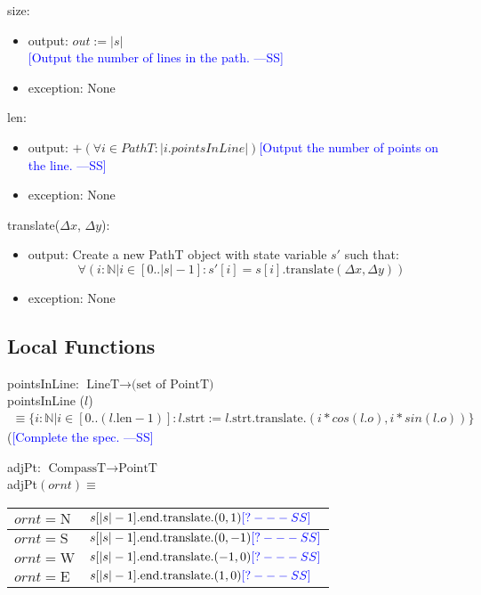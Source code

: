 \documentclass[12pt]{article}
\newcommand{\authornote}[3]{\textcolor{#1}{[#3 ---#2]}}
\newcommand{\authornote}[3]{}
\newcommand{\wss}[1]{\authornote{blue}{SS}{#1}}
\begin{document}
\noindent size:
\begin{itemize}
\item output: $out:=|s|$\\ \wss{Output the number of lines in the path.}
\item exception: None
\end{itemize}

\noindent len:
\begin{itemize}
\item output: $+(\forall i \in PathT: |i.pointsInLine|)$\wss{Output the number of points on the line.}
\item exception: None
\end{itemize}

\noindent translate($\Delta x$, $\Delta y$):
\begin{itemize}
\item output: Create a new PathT object with state variable $s'$ such that:
$$\forall(i: \mathbb{N} | i \in [0..|s|-1] : s'[i] = s[i].\mbox{translate}(\Delta x, \Delta y))$$
\item exception: None
\end{itemize}

\subsection*{Local Functions}

pointsInLine: $\mbox{LineT} \rightarrow \mbox{(set of PointT)}$\\

\noindent pointsInLine ($l$) 
\begin{multline*}
\equiv \{ i: \mathbb{N} | i \in [0
  .. (l.\mbox{len} - 1)] : l.\mbox{strt}:= l.\mbox{strt}.\mbox{translate}.(i*cos(l.o), i*sin(l.o))\}
\end{multline*} (\wss{Complete the spec.}

\noindent adjPt: $\mbox{CompassT} \rightarrow \mbox{PointT}$\\
adjPt$(ornt) \equiv$

\medskip

\begin{tabular}{|l|l|}
\hline
$ornt = \mbox{N}$ & $s[|s|-1].\mbox{end}.\mbox{translate}.(0, 1)\wss{?}$\\
\hline
$ornt = \mbox{S}$ & $s[|s|-1].\mbox{end}.\mbox{translate}.(0, -1)\wss{?}$\\
\hline
$ornt = \mbox{W}$ & $s[|s|-1].\mbox{end}.\mbox{translate}.(-1, 0)\wss{?}$\\
\hline
$ornt = \mbox{E}$ & $s[|s|-1].\mbox{end}.\mbox{translate}.(1, 0)\wss{?}$\\
\hline
\end{tabular}
\end{document}
